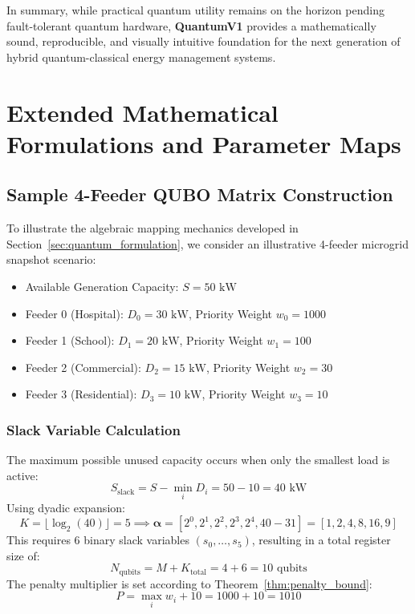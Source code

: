 \documentclass[11pt,a4paper]{article}
\theoremstyle{definition}
\theoremstyle{remark}
\begin{document}
In summary, while practical quantum utility remains on the horizon pending fault-tolerant quantum hardware, \textbf{QuantumV1} provides a mathematically sound, reproducible, and visually intuitive foundation for the next generation of hybrid quantum-classical energy management systems.

\appendix
\section{Extended Mathematical Formulations and Parameter Maps}
\label{sec:appendix}

\subsection{Sample 4-Feeder QUBO Matrix Construction}
To illustrate the algebraic mapping mechanics developed in Section~\ref{sec:quantum_formulation}, we consider an illustrative 4-feeder microgrid snapshot scenario:
\begin{itemize}
    \item Available Generation Capacity: $S = 50\text{ kW}$
    \item Feeder 0 (Hospital): $D_0 = 30\text{ kW}$, Priority Weight $w_0 = 1000$
    \item Feeder 1 (School): $D_1 = 20\text{ kW}$, Priority Weight $w_1 = 100$
    \item Feeder 2 (Commercial): $D_2 = 15\text{ kW}$, Priority Weight $w_2 = 30$
    \item Feeder 3 (Residential): $D_3 = 10\text{ kW}$, Priority Weight $w_3 = 10$
\end{itemize}

\subsubsection{Slack Variable Calculation}
The maximum possible unused capacity occurs when only the smallest load is active:
\begin{equation}
S_{\text{slack}} = S - \min_{i} D_i = 50 - 10 = 40\text{ kW}
\end{equation}
Using dyadic expansion:
\begin{equation}
K = \lfloor \log_2(40) \rfloor = 5 \implies \boldsymbol{\alpha} = [2^0, 2^1, 2^2, 2^3, 2^4, 40 - 31] = [1, 2, 4, 8, 16, 9]
\end{equation}
This requires 6 binary slack variables $(s_0, \dots, s_5)$, resulting in a total register size of:
\begin{equation}
N_{\text{qubits}} = M + K_{\text{total}} = 4 + 6 = 10\text{ qubits}
\end{equation}
The penalty multiplier is set according to Theorem~\ref{thm:penalty_bound}:
\begin{equation}
P = \max_i w_i + 10 = 1000 + 10 = 1010
\end{equation}
\end{document}
